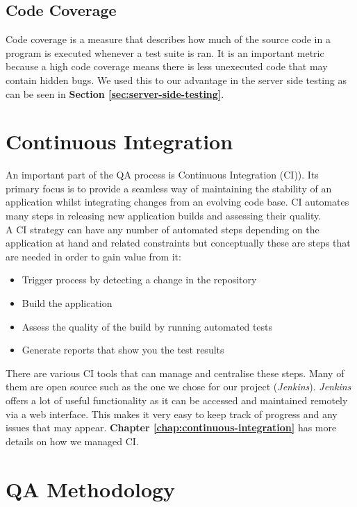 \subsection{Code Coverage}
\label{subsec:code-coverage}

Code coverage is a measure that describes how much of the source code in a program is executed whenever a test suite is ran. It is an important metric because a high code coverage means there is less unexecuted code that may contain hidden bugs. We used this to our advantage in the server side testing as can be seen in \textbf{Section \ref{sec:server-side-testing}}.

\section{Continuous Integration}
\label{sec:continuous-integration}

An important part of the QA process is Continuous Integration (CI)). Its primary focus is to provide a seamless way of maintaining the stability of an application whilst integrating changes from an evolving code base. CI automates many steps in releasing new application builds and assessing their quality.
\\

A CI strategy can have any number of automated steps depending on the application at hand and related constraints but conceptually these are steps that are needed in order to gain value from it:

\begin{itemize}
    \item Trigger process by detecting a change in the repository
    \item Build the application
    \item Assess the quality of the build by running automated tests
    \item Generate reports that show you the test results
\end{itemize}

There are various CI tools that can manage and centralise these steps. Many of them are open source such as the one we chose for our project (\textit{Jenkins}). \textit{Jenkins} offers a lot of useful functionality as it can be accessed and maintained remotely via a web interface. This makes it very easy to keep track of progress and any issues that may appear. \textbf{Chapter \ref{chap:continuous-integration}} has more details on how we managed CI.

\section{QA Methodology}
\label{sec:qa-methodology}


